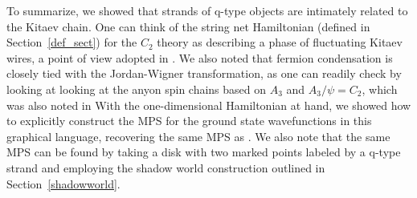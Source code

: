 To summarize, we showed that strands of q-type objects are intimately related to the Kitaev chain. 
One can think of the string net Hamiltonian (defined in Section~\ref{def_sect}) for the $C_2$ theory as describing a phase of fluctuating Kitaev wires, a point of view adopted in \cite{tarantino2016,ware2016,kapustin2017}.
We also noted that fermion condensation is closely tied with the Jordan-Wigner transformation, as one can readily check by looking at looking at the anyon spin chains based on $A_3$ and $A_3/\psi = C_2$, which was also noted in \cite{Kapustin again?} 
With the one-dimensional Hamiltonian at hand, we showed how to explicitly construct the MPS for the ground state wavefunctions in this graphical language, recovering the same MPS as \cite{fidkowski2011,turzillo2016,bultinck2017b}. 
We also note that the same MPS can be found by taking a disk with two marked points labeled by a q-type strand %
and employing the shadow world construction outlined in Section~\ref{shadowworld}.


